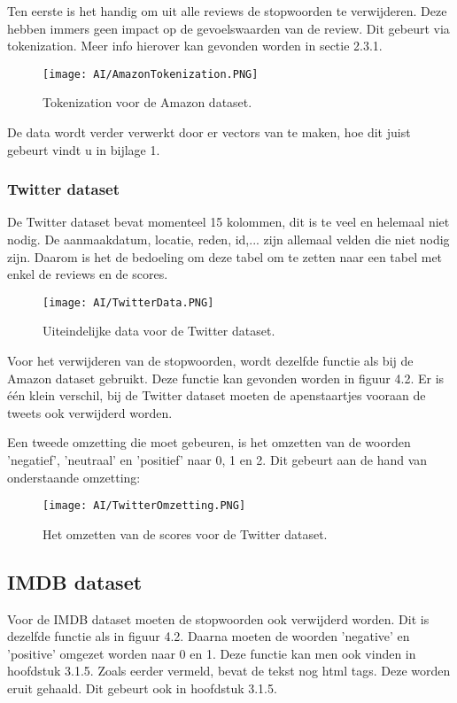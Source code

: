 Ten eerste is het handig om uit alle reviews de stopwoorden te verwijderen. Deze hebben immers geen impact op de gevoelswaarden van de review. Dit gebeurt via tokenization. Meer info hierover kan gevonden worden in sectie 2.3.1.

\begin{figure}[!htbp]
    \texttt{[image: AI/AmazonTokenization.PNG]}
    \caption{\label{amazontokenization}Tokenization voor de Amazon dataset.}
\end{figure}
\FloatBarrier

De data wordt verder verwerkt door er vectors van te maken, hoe dit juist gebeurt vindt u in bijlage 1.

\subsubsection{Twitter dataset} 
De Twitter dataset bevat momenteel 15 kolommen, dit is te veel en helemaal niet nodig. De aanmaakdatum, locatie, reden, id,... zijn allemaal velden die niet nodig zijn. Daarom is het de bedoeling om deze tabel om te zetten naar een tabel met enkel de reviews en de scores. 


\begin{figure}[!htbp]
    \texttt{[image: AI/TwitterData.PNG]}
    \caption{\label{twitterdata}Uiteindelijke data voor de Twitter dataset.}
\end{figure}
\FloatBarrier

Voor het verwijderen van de stopwoorden, wordt dezelfde functie als bij de Amazon dataset gebruikt. Deze functie kan gevonden worden in figuur 4.2. Er is één klein verschil, bij de Twitter dataset moeten de apenstaartjes vooraan de tweets ook verwijderd worden. 

Een tweede omzetting die moet gebeuren, is het omzetten van de woorden 'negatief', 'neutraal' en 'positief' naar 0, 1 en 2. Dit gebeurt aan de hand van onderstaande omzetting:

\begin{figure}[!htbp]
    \texttt{[image: AI/TwitterOmzetting.PNG]}
    \caption{\label{twitteromzetting}Het omzetten van de scores voor de Twitter dataset.}
\end{figure}
\FloatBarrier

\subsection{IMDB dataset}
Voor de IMDB dataset moeten de stopwoorden ook verwijderd worden. Dit is dezelfde functie als in figuur 4.2. Daarna moeten de woorden 'negative' en 'positive' omgezet worden naar 0 en 1. Deze functie kan men ook vinden in hoofdstuk 3.1.5. Zoals eerder vermeld, bevat de tekst nog html tags. Deze worden eruit gehaald. Dit gebeurt ook in hoofdstuk 3.1.5.



